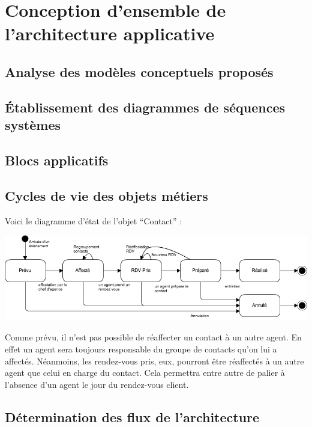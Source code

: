

\section{Conception d'ensemble de l'architecture applicative}

\subsection{Analyse des modèles conceptuels proposés}

\subsection{Établissement des diagrammes de séquences systèmes}

\subsection{Blocs applicatifs}


\subsection{Cycles de vie des objets métiers}

Voici le diagramme d'état de l'objet ``Contact'' :

\begin {center}
\includegraphics[width=\textwidth]{diagramme-etat-objet-contact.png}
\end {center}
Comme prévu, il n'est pas possible de réaffecter un contact à un autre agent. En effet un agent sera toujours responsable du groupe de contacts qu'on lui a affectés. Néanmoins, les rendez-vous pris, eux, pourront être réaffectés à un autre agent que celui en charge du contact. Cela permettra entre autre de palier à l'absence d'un agent le jour du rendez-vous client.


\subsection{Détermination des flux de l'architecture}

